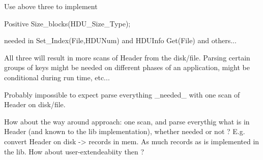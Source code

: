 Use above three to implement

 Positive Size_blocks(HDU_Size_Type);

needed in Set_Index(File,HDUNum) and
HDUInfo Get(File) and others...

All three will result in more scans of Header from the disk/file.
Parsing certain groups of keys might be needed on different
phases of an application, might be conditional during run time, etc...

Probably impossible to expect parse everything _needed_ with one scan
of Header on disk/file.

How about the way around approach: 
one scan, and parse everythig what is in Header (and known to 
the lib implementation), whether needed or not ?
E.g. convert Header on disk -> records in mem. As much records 
as is implemented in the lib. How about user-extendeabiity then ?


